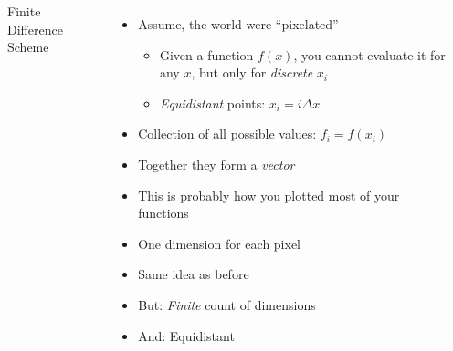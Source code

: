 \begin{frame}
%
\begin{columns}[t]
\begin{Large}
	{Finite Difference Scheme}
	\vspace{12pt}
\end{Large}
%
\begin{itemize}
\item Assume, the world were \enquote{pixelated}
	\begin{itemize}
	\item Given a function $f(x)$, you cannot evaluate it for any $x$, but only for \emph{discrete} $x_i$
	\item \emph{Equidistant} points: $x_i = i \Delta x$
	\end{itemize}
\item Collection of all possible values: $f_i = f(x_i)$
\item[\Thus] Together they form a \emph{vector}
\item This is probably how you plotted most of your functions
\item One dimension for each pixel
\item[\Thus] Same idea as before
\item[\Thus] But: \emph{Finite} count of dimensions
\item[\Thus] And: Equidistant
\end{itemize}
%
\begin{center}
	\tiny

\end{center}
\end{columns}
\end{frame}
